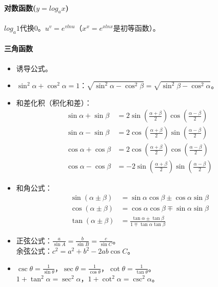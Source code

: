 \documentclass[
12pt, %
a4paper, 
oneside, %
headinclude,footinclude, %
]{scrartcl}
\begin{document}
\paragraph{对数函数($ y = log_a x $)}
$ log_a 1 $代换$ 0 $。$ u^v = e^{v ln u} $（$ x^x = e^{x ln x} $是初等函数）。
\paragraph{三角函数}
\begin{itemize}
\item 诱导公式。
\item $ \sin^2\alpha + \cos^2\alpha = 1 $：$ \sqrt{\sin^2\alpha - \cos^2\beta} = \sqrt{\sin^2\beta - \cos^2\alpha} $。
\item 和差化积（积化和差）：
\begin{align*}
\sin\alpha + \sin\beta &= 2 \sin(\frac{\alpha + \beta}{2}) \cos(\frac{\alpha - \beta}{2}) \\
\sin\alpha - \sin\beta &= 2 \cos(\frac{\alpha + \beta}{2}) \sin(\frac{\alpha - \beta}{2}) \\
\cos\alpha + \cos\beta &= 2 \cos(\frac{\alpha + \beta}{2}) \cos(\frac{\alpha - \beta}{2}) \\
\cos\alpha - \cos\beta &= -2 \sin(\frac{\alpha + \beta}{2}) \sin(\frac{\alpha - \beta}{2})
\end{align*}
\item 和角公式：
\begin{align*}
\sin(\alpha \pm \beta) &= \sin\alpha \cos\beta \pm \cos\alpha \sin\beta \\
\cos(\alpha \pm \beta) &= \cos\alpha \cos\beta \mp \sin\alpha \sin\beta \\
\tan(\alpha \pm \beta) &= \frac{\tan\alpha \pm \tan\beta}{1 \mp \tan\alpha \tan\beta}
\end{align*}
\item 正弦公式：$ \frac{a}{\sin A} = \frac{b}{\sin B} = \frac{c}{\sin C} $。 \\
余弦公式：$ c^2 = a^2 + b^2 - 2ab\cos C $。
\item $ \csc\theta = \frac{1}{\sin\theta} $，$ \sec\theta = \frac{1}{\cos\theta} $，$ \cot\theta = \frac{1}{\tan\theta} $。 \\
$ 1 + \tan^2\alpha = \sec^2\alpha $，$ 1+\cot^2\alpha = \csc^2\alpha $。
\end{itemize}
\end{document}
